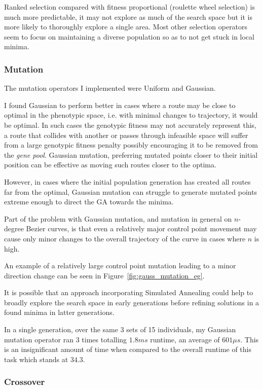 Ranked selection compared with fitness proportional (roulette wheel selection) is much more predictable, it may not explore as much of the search space but it is more likely to thoroughly explore a single area. Most other selection operators seem to focus on maintaining a diverse population so as to not get stuck in local minima.

\subsubsection{Mutation}

The mutation operators I implemented were Uniform and Gaussian.

I found Gaussian to perform better in cases where a route may be close to optimal in the phenotypic space, i.e. with minimal changes to trajectory, it would be optimal. In such cases the genotypic fitness may not accurately represent this, a route that collides with another or passes through infeasible space will suffer from a large genotypic fitness penalty possibly encouraging it to be removed from the \textit{gene pool}. Gaussian mutation, preferring mutated points closer to their initial position can be effective as moving such routes closer to the optima.

However, in cases where the initial population generation has created all routes far from the optimal, Gaussian mutation can struggle to generate mutated points extreme enough to direct the GA towards the minima.

Part of the problem with Gaussian mutation, and mutation in general on $n$-degree Bezier curves, is that even a relatively major control point movement may cause only minor changes to the overall trajectory of the curve in cases where $n$ is high.

An example of a relatively large control point mutation leading to a minor direction change can be seen in Figure~\ref{fig:gauss_mutation_eg}.

It is possible that an approach incorporating Simulated Annealing could help to broadly explore the search space in early generations before refining solutions in a found minima in latter generations.

In a single generation, over the same 3 sets of 15 individuals, my Gaussian mutation operator ran 3 times totalling $1.8 ms$ runtime, an average of $601 \mu s$. This is an insignificant amount of time when compared to the overall runtime of this task which stands at $34.3$.

\subsubsection{Crossover}

